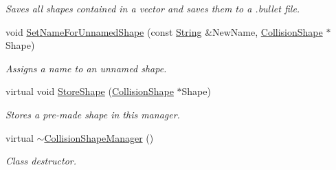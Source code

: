 \begin{DoxyCompactItemize}
\begin{DoxyCompactList}\small\item\em Saves all shapes contained in a vector and saves them to a .bullet file. \item\end{DoxyCompactList}\item 
void \hyperlink{classphys_1_1CollisionShapeManager_abdf39e87665139e946a9263e7130554f}{SetNameForUnnamedShape} (const \hyperlink{namespacephys_aa03900411993de7fbfec4789bc1d392e}{String} \&NewName, \hyperlink{classphys_1_1CollisionShape}{CollisionShape} $\ast$Shape)
\begin{DoxyCompactList}\small\item\em Assigns a name to an unnamed shape. \item\end{DoxyCompactList}\item 
virtual void \hyperlink{classphys_1_1CollisionShapeManager_a37a9606fe80beb9d7c2c03137f449b4f}{StoreShape} (\hyperlink{classphys_1_1CollisionShape}{CollisionShape} $\ast$Shape)
\begin{DoxyCompactList}\small\item\em Stores a pre-\/made shape in this manager. \item\end{DoxyCompactList}\item 
\hypertarget{classphys_1_1CollisionShapeManager_a745e1110d70be3983b89e5ba034fa616}{
virtual \hyperlink{classphys_1_1CollisionShapeManager_a745e1110d70be3983b89e5ba034fa616}{$\sim$CollisionShapeManager} ()}
\label{classphys_1_1CollisionShapeManager_a745e1110d70be3983b89e5ba034fa616}

\begin{DoxyCompactList}\small\item\em Class destructor. \item\end{DoxyCompactList}\end{DoxyCompactItemize}
